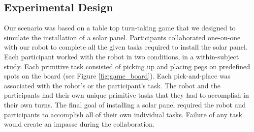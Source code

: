 \documentclass[12pt]{report}
\begin{document}
\subsection{Experimental Design}
\label{sec:experimental-design}
Our scenario was based on a table top turn-taking game that we designed to
simulate the installation of a solar panel. Participants collaborated one-on-one
with our robot to complete all the given tasks required to install the solar
panel. Each participant worked with the robot in two conditions, in a
within-subject study. Each primitive task consisted of picking up and placing
pegs on predefined spots on the board (see Figure \ref{fig:game_board}). Each
pick-and-place was associated with the robot's or the participant's task. The
robot and the participants had their own unique primitive tasks that they had to
accomplish in their own turns. The final goal of installing a solar panel
required the robot and participants to accomplish all of their own individual
tasks. Failure of any task would create an impasse during the collaboration.
\end{document}
